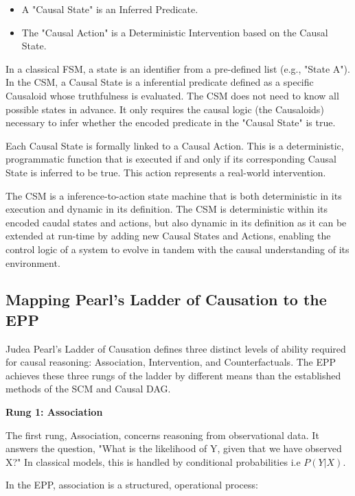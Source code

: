 \begin{itemize}
    \item A "Causal State" is an Inferred Predicate.
    \item The "Causal Action" is a Deterministic Intervention based on the Causal State.
\end{itemize}

In a classical FSM, a state is an identifier from a pre-defined list (e.g., "State A").
In the CSM, a Causal State is a inferential predicate defined as a specific Causaloid whose truthfulness is evaluated. The CSM does not need to know all possible states in advance. It only requires the causal logic (the Causaloids) necessary to infer whether the encoded predicate in the "Causal State" is true.

Each Causal State is formally linked to a Causal Action. This is a deterministic, programmatic function that is executed if and only if its corresponding Causal State is inferred to be true. This action represents a real-world intervention.

The CSM is a inference-to-action state machine that is both deterministic in its execution and dynamic in its definition. The CSM is deterministic within its encoded caudal states and actions, but also dynamic in its definition as it can be extended at run-time by adding new Causal States and Actions, enabling the control logic of a system to evolve in tandem with the causal understanding of its environment.

\newpage

\subsection{Mapping Pearl's Ladder of Causation to the EPP}
\label{sec:epp_ladder_causation}

Judea Pearl's Ladder of Causation\cite{pearl2000causality} defines three distinct levels of ability required for causal reasoning: Association, Intervention, and Counterfactuals. The EPP achieves these three rungs of the ladder by different means than the established methods of the SCM and Causal DAG.

\textbf{Rung 1: Association}

The first rung, Association, concerns reasoning from observational data.
It answers the question, "What is the likelihood of Y, given that we have observed X?" In classical models, this is handled by conditional probabilities i.e $P(Y|X)$.

In the EPP, association is a structured, operational process:

